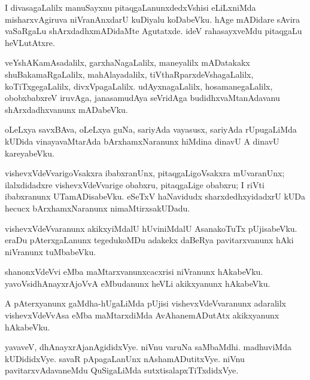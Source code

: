 \documentclass{article}
\begin{document}
\begin{mn}
I divasagaLalilx manuSayxnu pitaqgaLanunxdedxVshisi eLiLxniMda
misharxvAgiruva niVranAnxdarU kuDiyalu koDabeVku. hAge mADidare sAvira
vaSaRgaLu shArxdadhxmADidaMte Agutatxde. ideV rahasayxveMdu pitaqgaLu heVLutAtxre.
\end{mn}

\begin{mn}
veYshAKamAsadalilx, garxhaNagaLalilx, maneyalilx mADatakakx
shuBakamaRgaLalilx, mahAlayadalilx, tiVthaRparxdeVshagaLalilx,
koTiTxgegaLalilx, divxVpagaLalilx. udAyxnagaLalilx, hosamanegaLalilx,
obobxbabxreV iruvAga, janasamudAya seVridAga budidhxvaMtanAdavanu
shArxdadhxvanunx mADabeVku.
\end{mn}

\begin{mn}
oLeLxya savxBAva, oLeLxya guNa, sariyAda vayasusx, sariyAda
rUpugaLiMda kUDida vinayavaMtarAda bArxhamxNaranunx hiMdina dinavU A
dinavU kareyabeVku.
\end{mn}

\begin{mn}
vishevxVdeVvarigoVsakxra ibabxranUnx, pitaqgaLigoVsakxra mUvaranUnx;
ilalxdidadxre vishevxVdeVvarige obabxru, pitaqgaLige obabxru; I riVti
ibabxranunx UTamADisabeVku. eSeTxV haNavidudx sharxdedhxyidadxrU kUDa
hecucx bArxhamxNaranunx nimaMtirxsakUDadu.
\end{mn}

\begin{mn}%
vishevxVdeVvaranunx akikxyiMdalU hUviniMdalU AsanakoTuTx
pUjisabeVku. eraDu pAterxgaLanunx tegedukoMDu adakekx daBeRya
pavitarxvanunx hAki niVranunx tuMbabeVku.
\end{mn}

\begin{mn}
shanonxVdeVvi eMba maMtarxvanunxcacxrisi niVranunx
hAkabeVku. yavoVsidhAnayxrAjoVvA eMbudanunx heVLi akikxyanunx hAkabeVku.
\end{mn}

\begin{mn}
A pAterxyanunx gaMdha-hUgaLiMda pUjisi vishevxVdeVvaranunx adaralilx
vishevxVdeVvAsa eMba maMtarxdiMda AvAhanemADutAtx akikxyanunx hAkabeVku.
\end{mn}

\begin{mn}
yavaveV, dhAnayxrAjanAgididxVye. niVnu varuNa saMbaMdhi. madhuviMda
kUDididxVye. savaR pApagaLanUnx nAshamADutitxVye. niVnu
pavitarxvAdavaneMdu QuSigaLiMda sutxtisalapxTiTxdidxVye.
\end{mn}
\end{document}
